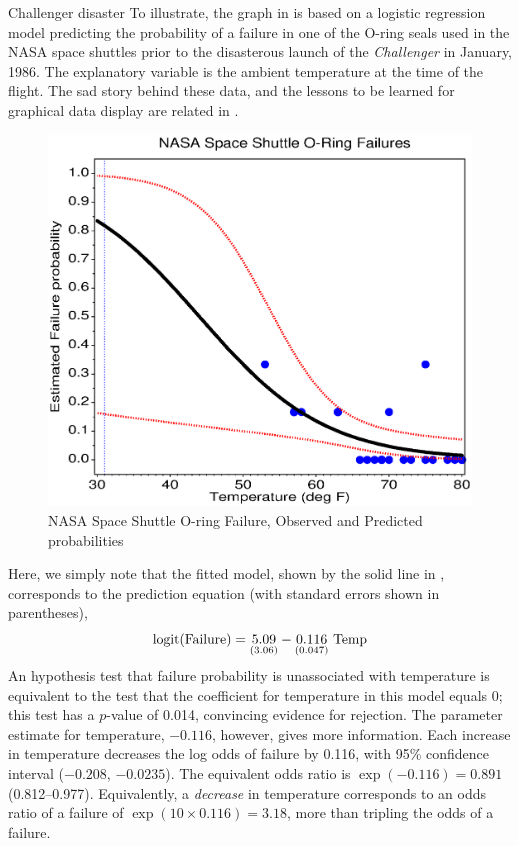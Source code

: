 \begin{Example}[nasa0]{Challenger disaster}
To illustrate, the graph in  is based on
a logistic regression model predicting the probability of a
failure in one of the O-ring seals used in the NASA space shuttles
prior to the disasterous launch of the 
\emph{Challenger} in January, 1986.  The explanatory variable is the ambient temperature at the time of the flight.
The sad story behind these data, and the lessons to be learned for
graphical data display are related in .
\begin{figure}[htb]
  \centering
  \includegraphics[scale=.6]{ch6/fig/nasa}
  \caption{NASA Space Shuttle 
  O-ring Failure, Observed and Predicted probabilities}\label{fig:nasa1}
\end{figure}

Here, we simply note that the fitted model, shown by the solid line in
, corresponds to the prediction equation
(with standard errors shown in parentheses),
\begin{equation*}
 \logit ( \mbox{Failure} ) =  \cwe{5.09}{3.06} - \cwe{0.116}{0.047} \mbox{ Temp} 
 \end{equation*}%
An hypothesis test that failure probability is unassociated with temperature
is equivalent to the test that the coefficient for temperature in this
model equals 0; this test has a $p$-value of 0.014, convincing evidence
for rejection.
The parameter estimate for temperature, $-0.116$, however, gives more information.  Each  increase in temperature decreases the log odds
of failure by 0.116, with 95\% confidence interval ($-0.208$, $-0.0235$).  The equivalent odds ratio is $\exp(-0.116) = 0.891$ (0.812--0.977).
Equivalently, a  \emph{decrease} in temperature corresponds to
an odds ratio of a failure of 
$\exp(10 \times 0.116) = 3.18$, more than tripling the odds of a failure.
 

\end{Example}
